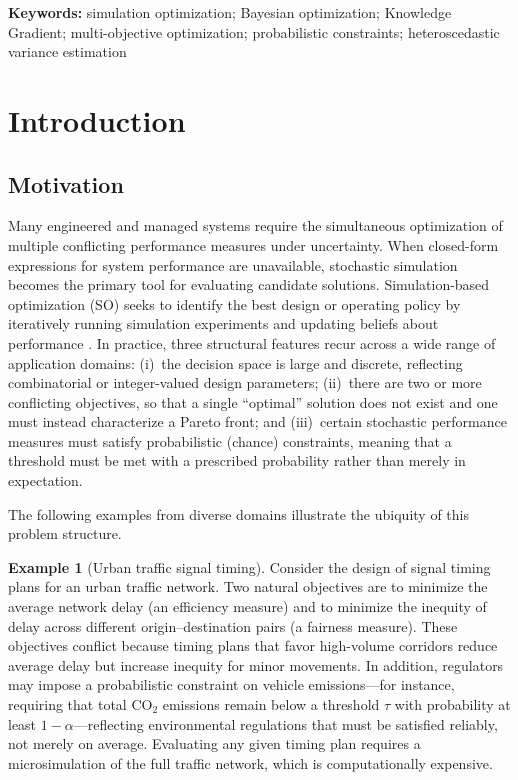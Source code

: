 \documentclass[12pt]{article}
\theoremstyle{plain}
\theoremstyle{definition}
\newtheorem{example}{Example}[section]
\theoremstyle{remark}
\begin{document}
\medskip
\noindent\textbf{Keywords:} simulation optimization; Bayesian optimization; Knowledge Gradient; multi-objective optimization; probabilistic constraints; heteroscedastic variance estimation

\section{Introduction}\label{sec:introduction}

\subsection{Motivation}\label{sec:motivation}

Many engineered and managed systems require the simultaneous
optimization of multiple conflicting performance measures under
uncertainty.  When closed-form expressions for system performance are
unavailable, stochastic simulation becomes the primary tool for
evaluating candidate solutions.  Simulation-based optimization (SO)
seeks to identify the best design or operating policy by iteratively
running simulation experiments and updating beliefs about performance
\citep{Fu2002,Hong2021}.  In practice, three structural features
recur across a wide range of application domains: (i)~the decision
space is large and discrete, reflecting combinatorial or integer-valued
design parameters; (ii)~there are two or more conflicting objectives,
so that a single ``optimal'' solution does not exist and one must
instead characterize a Pareto front; and (iii)~certain stochastic
performance measures must satisfy probabilistic (chance) constraints,
meaning that a threshold must be met with a prescribed probability
rather than merely in expectation.

The following examples from diverse domains illustrate the ubiquity of
this problem structure.

\begin{example}[Urban traffic signal timing]\label{ex:traffic}
Consider the design of signal timing plans for an urban traffic
network.  Two natural objectives are to minimize the average network
delay (an efficiency measure) and to minimize the inequity of delay
across different origin--destination pairs (a fairness measure).
These objectives conflict because timing plans that favor high-volume
corridors reduce average delay but increase inequity for minor
movements.  In addition, regulators may impose a probabilistic
constraint on vehicle emissions---for instance, requiring that total
\textup{CO}$_2$ emissions remain below a threshold $\tau$ with probability
at least $1-\alpha$---reflecting environmental regulations that must be
satisfied reliably, not merely on average.  Evaluating any given
timing plan requires a microsimulation of the full traffic network,
which is computationally expensive.
\end{example}
\end{document}
